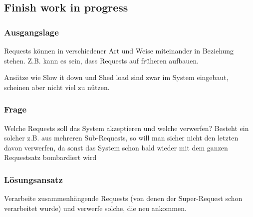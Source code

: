 \subsection{Finish work in progress}

\subsubsection*{Ausgangslage}


Requests können in verschiedener Art und Weise miteinander in Beziehung stehen. Z.B. kann es sein, dass Requests auf früheren aufbauen.

Ansätze wie Slow it down und Shed load sind zwar im System eingebaut, scheinen aber nicht viel zu nützen.

\subsubsection*{Frage}


Welche Requests soll das System akzeptieren und welche verwerfen?
Besteht ein solcher z.B. aus mehreren Sub-Requests, so will man sicher nicht den letzten davon verwerfen, da sonst das System schon bald wieder mit dem ganzen Requestsatz bombardiert wird

\subsubsection*{Lösungsansatz}


Verarbeite zusammenhängende Requests (von denen der Super-Request schon verarbeitet wurde) und verwerfe solche, die neu ankommen.
